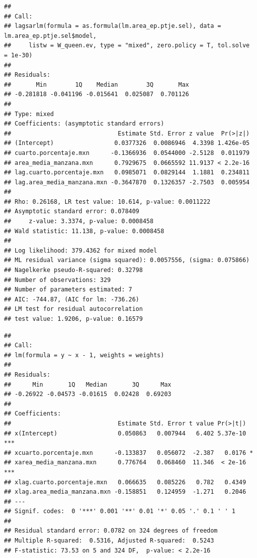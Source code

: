 \documentclass[12pt,]{book}
\newenvironment{Shaded}{\begin{snugshade}}{\end{snugshade}}
\newcommand{\KeywordTok}[1]{\textcolor[rgb]{0.13,0.29,0.53}{\textbf{#1}}}
\newcommand{\DataTypeTok}[1]{\textcolor[rgb]{0.13,0.29,0.53}{#1}}
\newcommand{\StringTok}[1]{\textcolor[rgb]{0.31,0.60,0.02}{#1}}
\newcommand{\CommentTok}[1]{\textcolor[rgb]{0.56,0.35,0.01}{\textit{#1}}}
\newcommand{\OperatorTok}[1]{\textcolor[rgb]{0.81,0.36,0.00}{\textbf{#1}}}
\newcommand{\NormalTok}[1]{#1}
\begin{document}
\begin{verbatim}
## 
## Call:
## lagsarlm(formula = as.formula(lm.area_ep.ptje.sel), data = lm.area_ep.ptje.sel$model, 
##     listw = W_queen.ev, type = "mixed", zero.policy = T, tol.solve = 1e-30)
## 
## Residuals:
##       Min        1Q    Median        3Q       Max 
## -0.281818 -0.041196 -0.015641  0.025087  0.701126 
## 
## Type: mixed 
## Coefficients: (asymptotic standard errors) 
##                              Estimate Std. Error z value  Pr(>|z|)
## (Intercept)                 0.0377326  0.0086946  4.3398 1.426e-05
## cuarto.porcentaje.mxn      -0.1366936  0.0544000 -2.5128  0.011979
## area_media_manzana.mxn      0.7929675  0.0665592 11.9137 < 2.2e-16
## lag.cuarto.porcentaje.mxn   0.0985071  0.0829144  1.1881  0.234811
## lag.area_media_manzana.mxn -0.3647870  0.1326357 -2.7503  0.005954
## 
## Rho: 0.26168, LR test value: 10.614, p-value: 0.0011222
## Asymptotic standard error: 0.078409
##     z-value: 3.3374, p-value: 0.0008458
## Wald statistic: 11.138, p-value: 0.0008458
## 
## Log likelihood: 379.4362 for mixed model
## ML residual variance (sigma squared): 0.0057556, (sigma: 0.075866)
## Nagelkerke pseudo-R-squared: 0.32798 
## Number of observations: 329 
## Number of parameters estimated: 7 
## AIC: -744.87, (AIC for lm: -736.26)
## LM test for residual autocorrelation
## test value: 1.9206, p-value: 0.16579
\end{verbatim}

\begin{Shaded}
\end{Shaded}

\begin{verbatim}
## 
## Call:
## lm(formula = y ~ x - 1, weights = weights)
## 
## Residuals:
##      Min       1Q   Median       3Q      Max 
## -0.26922 -0.04573 -0.01615  0.02428  0.69203 
## 
## Coefficients:
##                              Estimate Std. Error t value Pr(>|t|)    
## x(Intercept)                 0.050863   0.007944   6.402 5.37e-10 ***
## xcuarto.porcentaje.mxn      -0.133837   0.056072  -2.387   0.0176 *  
## xarea_media_manzana.mxn      0.776764   0.068460  11.346  < 2e-16 ***
## xlag.cuarto.porcentaje.mxn   0.066635   0.085226   0.782   0.4349    
## xlag.area_media_manzana.mxn -0.158851   0.124959  -1.271   0.2046    
## ---
## Signif. codes:  0 '***' 0.001 '**' 0.01 '*' 0.05 '.' 0.1 ' ' 1
## 
## Residual standard error: 0.0782 on 324 degrees of freedom
## Multiple R-squared:  0.5316, Adjusted R-squared:  0.5243 
## F-statistic: 73.53 on 5 and 324 DF,  p-value: < 2.2e-16
\end{verbatim}
\end{document}
